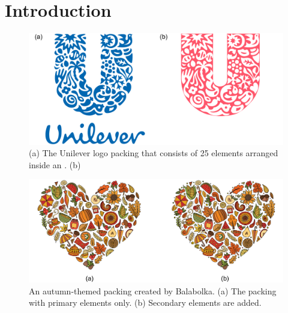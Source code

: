 
\chapter{Introduction}
\label{chapter_introduction}

\begin{figure}
\centering
\includegraphics[width=1.0\textwidth]{figures/intro/unilever_w_neg_space.pdf} 
\caption[Unilever logo packing and its negative space]
{\label{fig_logo_packing} 
(a) The Unilever logo packing that consists of 25 elements arranged inside an . 
(b) 
}
\end{figure}

\begin{figure}
\centering
\includegraphics[width=1.0\textwidth]{figures/intro/primary_secondary.pdf}
\caption[Primary and secondary elements]{
  \label{fig_primary_secondary}
  \nnewtext
  {
  An autumn-themed packing created by Balabolka. }
  (a) The packing with primary elements only.
  (b) Secondary elements are added. 
}
\end{figure}


